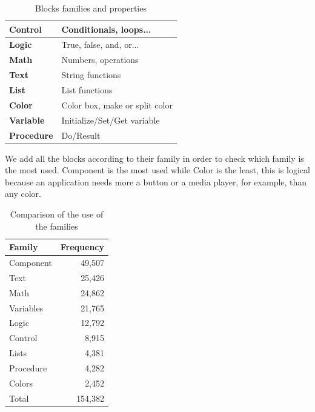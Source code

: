 \documentclass[a4paper]{article}
\begin{document}
\begin{table}[ht]
\begin{center}
\caption{Blocks families and properties}
\bigskip
\label{tab:block-fam}
\begin{tabular}{|l|l|}
\hline
\textbf{Control} & Conditionals, loops... \\ \hline
\textbf{Logic} & True, false, and, or... \\ \hline
\textbf{Math} & Numbers, operations\\ \hline
\textbf{Text} & String functions\\ \hline
\textbf{List} & List functions\\ \hline
\textbf{Color} & Color box, make or split color \\ \hline
\textbf{Variable} & Initialize/Set/Get variable\\ \hline
\textbf{Procedure} & Do/Result\\ \hline
\end{tabular}
\end{center}
\end{table}

We add all the blocks according to their family in order to check which family is the most used. Component is the most used while Color is the least, this is logical because an application needs more a button or a media player, for example, than any color.

\begin{table}[ht]
\begin{center}
\caption{Comparison of the use of the families}
\bigskip
\label{tab:block-fam-comp}
\begin{tabular}{|l|r|}
\hline
\textbf{Family} & \textbf{Frequency} \\ \hline
Component & 49,507 \\ \hline
Text	& 25,426\\ \hline
Math & 24,862\\ \hline
Variables & 21,765\\ \hline
Logic & 12,792\\ \hline
Control & 8,915\\ \hline
Lists & 4,381\\ \hline
Procedure & 4,282\\ \hline
Colors & 2,452\\ \hline
Total & 154,382\\ \hline
\end{tabular}
\end{center}
\end{table}
\end{document}

